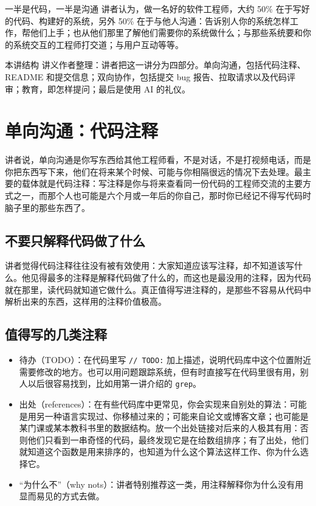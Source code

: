 \documentclass[a4paper]{article}
\begin{document}
\begin{importantbox}{一半是代码，一半是沟通}
讲者认为，做一名好的软件工程师，大约 50\% 在于写好的代码、构建好的系统，另外 50\% 在于与他人沟通：告诉别人你的系统怎样工作，帮他们上手；也从他们那里了解他们需要你的系统做什么；与那些系统要和你的系统交互的工程师打交道；与用户互动等等。
\end{importantbox}

\begin{knowledgebox}{本讲结构}
讲义作者整理：讲者把这一讲分为四部分。单向沟通，包括代码注释、README 和提交信息；双向协作，包括提交 bug 报告、拉取请求以及代码评审；教育，即怎样提问；最后是使用 AI 的礼仪。
\end{knowledgebox}

\section{单向沟通：代码注释}

讲者说，单向沟通是你写东西给其他工程师看，不是对话，不是打视频电话，而是你把东西写下来，他们在将来某个时候、可能与你相隔很远的情况下去处理。最主要的载体就是代码注释：写注释是你与将来查看同一份代码的工程师交流的主要方式之一，而那个人也可能是六个月或一年后的你自己，那时你已经记不得写代码时脑子里的那些东西了。

\subsection{不要只解释代码做了什么}

讲者觉得代码注释往往没有被有效使用：大家知道应该写注释，却不知道该写什么。他见得最多的注释是解释代码做了什么的，而这也是最没用的注释，因为代码就在那里，读代码就知道它做什么。真正值得写进注释的，是那些不容易从代码中解析出来的东西，这样用的注释价值极高。

\subsection{值得写的几类注释}

\begin{itemize}
\item 待办（TODO）：在代码里写 \texttt{// TODO:} 加上描述，说明代码库中这个位置附近需要修改的地方。也可以用问题跟踪系统，但有时直接写在代码里很有用，别人以后很容易找到，比如用第一讲介绍的 \texttt{grep}。
\item 出处（references）：在有些代码库中更常见，你会实现来自别处的算法：可能是用另一种语言实现过、你移植过来的；可能来自论文或博客文章；也可能是某门课或某本教科书里的数据结构。放一个出处链接对后来的人极其有用：否则他们只看到一串奇怪的代码，最终发现它是在给数组排序；有了出处，他们就知道这个函数是用来排序的，也知道为什么这个算法这样工作、你为什么选择它。
\item “为什么不”（why nots）：讲者特别推荐这一类，用注释解释你为什么没有用显而易见的方式去做。
\end{itemize}
\end{document}
